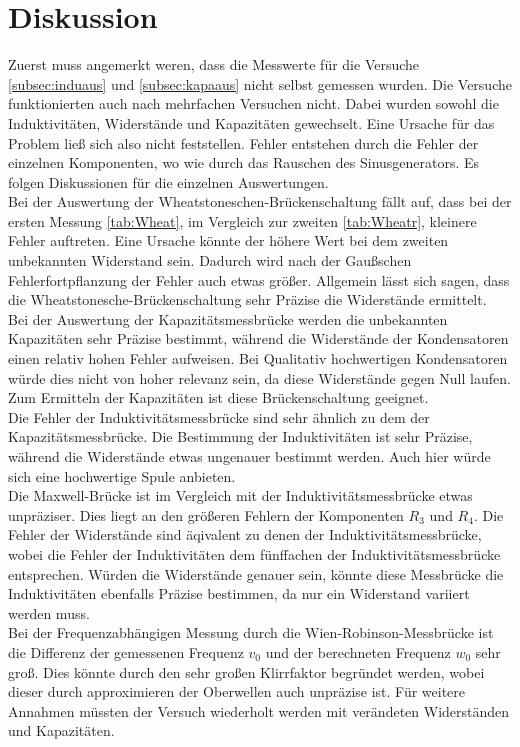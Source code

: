 \section{Diskussion}
\label{sec:Diskussion}
Zuerst muss angemerkt weren, dass die Messwerte für die Versuche \ref{subsec:induaus} und \ref{subsec:kapaaus} nicht selbst gemessen wurden.
Die Versuche funktionierten auch nach mehrfachen Versuchen nicht. Dabei wurden sowohl die Induktivitäten, Widerstände und Kapazitäten gewechselt.
Eine Ursache für das Problem ließ sich also nicht feststellen.
Fehler entstehen durch die Fehler der einzelnen Komponenten, wo wie durch das Rauschen des Sinusgenerators.
Es folgen Diskussionen für die einzelnen Auswertungen.\\
Bei der Auswertung der Wheatstoneschen-Brückenschaltung fällt auf, dass bei der ersten Messung \ref{tab:Wheat}, im Vergleich zur zweiten \ref{tab:Wheatr}, kleinere Fehler auftreten.
Eine Ursache könnte der höhere Wert bei dem zweiten unbekannten Widerstand sein. Dadurch wird nach der Gaußschen Fehlerfortpflanzung
der Fehler auch etwas größer.
Allgemein lässt sich sagen, dass die Wheatstonesche-Brückenschaltung sehr Präzise die Widerstände ermittelt.\\
Bei der Auswertung der Kapazitätsmessbrücke werden die unbekannten Kapazitäten sehr Präzise bestimmt, während die Widerstände der Kondensatoren einen relativ hohen Fehler aufweisen.
Bei Qualitativ hochwertigen Kondensatoren würde dies nicht von hoher relevanz sein, da diese Widerstände gegen Null laufen.
Zum Ermitteln der Kapazitäten ist diese Brückenschaltung geeignet. \\
Die Fehler der Induktivitätsmessbrücke sind sehr ähnlich zu dem der Kapazitätsmessbrücke.
Die Bestimmung der Induktivitäten ist sehr Präzise, während die Widerstände etwas ungenauer bestimmt werden.
Auch hier würde sich eine hochwertige Spule anbieten.\\
Die Maxwell-Brücke ist im Vergleich mit der Induktivitätsmessbrücke etwas unpräziser.
Dies liegt an den größeren Fehlern der Komponenten $R_3$ und $R_4$. 
Die Fehler der Widerstände sind äqivalent zu denen der Induktivitätsmessbrücke, wobei die Fehler der Induktivitäten dem fünffachen der
Induktivitätsmessbrücke entsprechen. Würden die Widerstände genauer sein, könnte diese Messbrücke die Induktivitäten ebenfalls Präzise bestimmen, 
da nur ein Widerstand variiert werden muss.\\
Bei der Frequenzabhängigen Messung durch die Wien-Robinson-Messbrücke ist die Differenz der gemessenen Frequenz $v_0$ und der berechneten Frequenz $w_0$ sehr groß.
Dies könnte durch den sehr großen Klirrfaktor begründet werden, wobei dieser durch approximieren der Oberwellen auch unpräzise ist.
Für weitere Annahmen müssten der Versuch wiederholt werden mit verändeten Widerständen und Kapazitäten.

